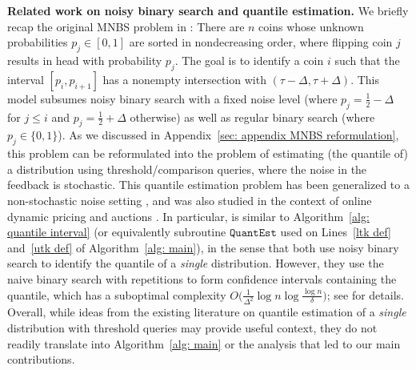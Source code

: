 \textbf{Related work on noisy binary search and quantile estimation.}
We briefly recap the original MNBS problem in \cite{karp2007noisy, gretta2023sharp}:
There are $n$ coins whose unknown probabilities $p_j \in [0, 1]$ are sorted in nondecreasing order, where flipping coin $j$ results in head with probability $p_j$. The goal is to identify a coin $i$ such that the interval $[p_i, p_{i+1}]$ has a nonempty intersection with $(\tau - \Delta, \tau + \Delta)$. This model subsumes noisy binary search with a fixed noise level \cite{burnashev1974interval, ben2008bayesian, dereniowski2021noisy, gu2023optimal} (where $p_j = \frac{1}{2} - \Delta$ for $j \leq i$ and $p_j = \frac{1}{2} + \Delta$ otherwise) as well as regular binary search (where $p_j \in \{0, 1\}$). As we discussed in Appendix~\ref{sec: appendix MNBS reformulation}, this problem can be reformulated into the problem of estimating (the quantile of) a distribution using threshold/comparison queries, where the noise in the feedback is stochastic.  This quantile estimation problem has been generalized to a non-stochastic noise setting \cite{meister2021learning, okoroafor2023non}, and was also studied in the context of online dynamic pricing and auctions \cite{kleinberg2003value, leme2023pricing, leme2023description}. 
In particular, \cite[Algorithm~1]{leme2023pricing} is similar to Algorithm~\ref{alg: quantile interval} (or equivalently subroutine $\mathtt{QuantEst}$ used on Lines~\ref{ltk def} and~\ref{utk def} of Algorithm~\ref{alg: main}), in the sense that both use noisy binary search to identify the quantile of a \textit{single} distribution. However, they use the naive binary search with repetitions to form confidence intervals containing the quantile, which has a suboptimal complexity $O \big( \frac{1}{\Delta^2} \log n \log  \frac{\log n}{\delta} \big)$; see \cite[\S 1.2]{karp2007noisy} for details.  Overall, while ideas from the existing literature on quantile estimation of a \textit{single} distribution with threshold queries may provide useful context, they do not readily translate into Algorithm~\ref{alg: main} or the analysis that led to our main contributions.








